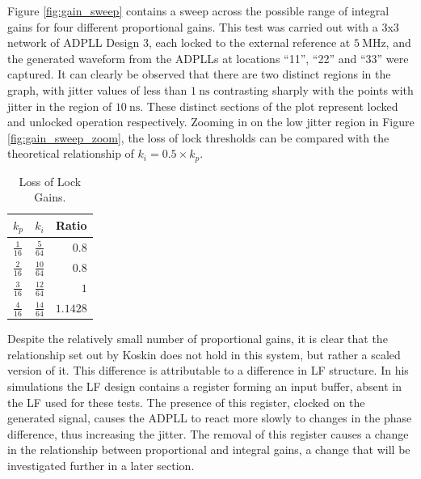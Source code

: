 Figure \ref{fig:gain_sweep} contains a sweep across the possible range of integral gains for four different proportional gains. This test was carried out with a 3x3 network of \ac{ADPLL} Design 3, each locked to the external reference at $5~\si{\mega\hertz}$, and the generated waveform from the \ac{ADPLL}s at locations ``11'', ``22'' and  ``33'' were captured. It can clearly be observed that there are two distinct regions in the graph, with jitter values of less than $1~\si{\nano\second}$ contrasting sharply with the points with jitter in the region of $10~\si{\nano\second}$. These distinct sections of the plot represent locked and unlocked operation respectively. Zooming in on the low jitter region in Figure \ref{fig:gain_sweep_zoom}, the loss of lock thresholds can be compared with the theoretical relationship of $k_i = 0.5\times k_p$.
\begin{table}[!h]
    \begin{center}
        \begin{tabular}{lrr}
            \multicolumn{1}{c}{$k_p$} & \multicolumn{1}{c}{$k_i$} & \multicolumn{1}{c}{Ratio} \T\B\\
            \hline
            $\frac{1}{16}$            & $\frac{5}{64}$            & $0.8$                     \T\B\\
            $\frac{2}{16}$            & $\frac{10}{64}$           & $0.8$                     \T\B\\
            $\frac{3}{16}$            & $\frac{12}{64}$           & $1$                       \T\B\\
            $\frac{4}{16}$            & $\frac{14}{64}$           & $1.1428$                  \T\B
        \end{tabular}
    \end{center}
    \vspace{-0.5cm}
    \caption[Loss of Lock Gains]{Loss of Lock Gains.}
    \label{table:lolgains}
\end{table}

Despite the relatively small number of proportional gains, it is clear that the relationship set out by Koskin does not hold in this system, but rather a scaled version of it.  This difference is attributable to a difference in \ac{LF} structure. In his simulations the \ac{LF} design contains a register forming an input buffer, absent in the \ac{LF} used for these tests. The presence of this register, clocked on the generated signal, causes the \ac{ADPLL} to react more slowly to changes in the phase difference, thus increasing the jitter. The removal of this register causes a change in the relationship between proportional and integral gains, a change that will be investigated further in a later section.

